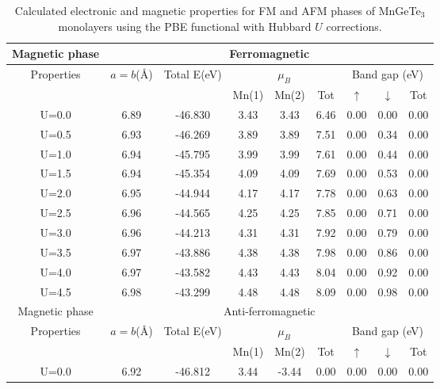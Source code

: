 \begin{table}[H]
	\centering
	\setlength{\extrarowheight}{0.5ex}
	\caption{Calculated electronic and magnetic properties for FM and AFM phases of MnGeTe$_3$ monolayers using the PBE functional with Hubbard $U$ corrections.}
	\begin{tabular}{cccccc|ccc}
		\toprule
		\toprule
		\rowcolor{WhiteSmoke!70!Lavender}
		Magnetic phase & \multicolumn{8}{c}{Ferromagnetic} \\
		\midrule
		\multirow{2}{*}{Properties} & \multirow{2}{*}{$a=b$(\AA)}& \multirow{2}{*}{Total E(eV)} & \multicolumn{3}{c}{$\mu_{B}$} & \multicolumn{3}{c}{Band gap (eV)}  \\
		\cline{4-9}
		& & & Mn(1)& Mn(2) & Tot  & $\uparrow$ & $\downarrow$ &  Tot \\
		\midrule
		U=0.0 & 6.89 & -46.830 & 3.43 & 3.43 & 6.46 & 0.00 & 0.00 & 0.00 \\
		U=0.5 & 6.93 & -46.269 & 3.89 & 3.89 & 7.51 & 0.00 & 0.34 & 0.00 \\
		U=1.0 & 6.94 & -45.795 & 3.99 & 3.99 & 7.61 & 0.00 & 0.44 & 0.00 \\
		U=1.5 & 6.94 & -45.354 & 4.09 & 4.09 & 7.69 & 0.00 & 0.53 & 0.00 \\
		U=2.0 & 6.95 & -44.944 & 4.17 & 4.17 & 7.78 & 0.00 & 0.63 & 0.00 \\
		U=2.5 & 6.96 & -44.565 & 4.25 & 4.25 & 7.85 & 0.00 & 0.71 & 0.00 \\
		U=3.0 & 6.96 & -44.213 & 4.31 & 4.31 & 7.92 & 0.00 & 0.79 & 0.00 \\
		U=3.5 & 6.97 & -43.886 & 4.38 & 4.38 & 7.98 & 0.00 & 0.86 & 0.00 \\
		U=4.0 & 6.97 & -43.582 & 4.43 & 4.43 & 8.04 & 0.00 & 0.92 & 0.00 \\
		U=4.5 & 6.98 & -43.299 & 4.48 & 4.48 & 8.09 & 0.00 & 0.98 & 0.00 \\
		\midrule
		\rowcolor{WhiteSmoke!70!Lavender}
		Magnetic phase & \multicolumn{8}{c}{Anti-ferromagnetic} \\
		\midrule
		\multirow{2}{*}{Properties} & \multirow{2}{*}{$a=b$(\AA)}& \multirow{2}{*}{Total E(eV)} & \multicolumn{3}{c}{$\mu_{B}$} & \multicolumn{3}{c}{Band gap (eV)}  \\
		\cline{4-9}
		& & & Mn(1)& Mn(2) & Tot  & $\uparrow$ & $\downarrow$ &  Tot \\
		\midrule
		U=0.0 & 6.92 & -46.812 & 3.44 & -3.44 & 0.00 & 0.00 & 0.00 & 0.00 \\

\end{tabular}
\end{table}

